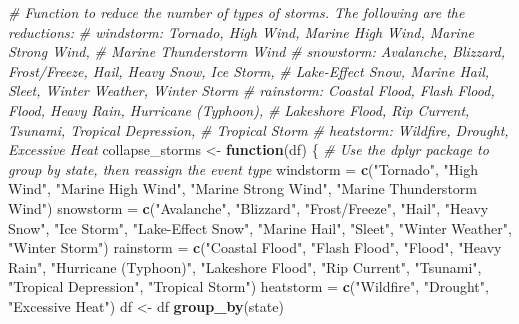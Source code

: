 \documentclass[10pt,]{article}
\newenvironment{Shaded}{}{}
\newcommand{\KeywordTok}[1]{\textcolor[rgb]{0.00,0.44,0.13}{\textbf{#1}}}
\newcommand{\StringTok}[1]{\textcolor[rgb]{0.25,0.44,0.63}{#1}}
\newcommand{\CommentTok}[1]{\textcolor[rgb]{0.38,0.63,0.69}{\textit{#1}}}
\newcommand{\ControlFlowTok}[1]{\textcolor[rgb]{0.00,0.44,0.13}{\textbf{#1}}}
\newcommand{\OperatorTok}[1]{\textcolor[rgb]{0.40,0.40,0.40}{#1}}
\newcommand{\NormalTok}[1]{#1}
\begin{document}
\begin{Shaded}
\begin{Highlighting}[]
\CommentTok{# Function to reduce the number of types of storms. The following are the reductions:}
\CommentTok{# windstorm: Tornado, High Wind, Marine High Wind, Marine Strong Wind,}
\CommentTok{#            Marine Thunderstorm Wind}
\CommentTok{# snowstorm: Avalanche, Blizzard, Frost/Freeze, Hail, Heavy Snow, Ice Storm, }
\CommentTok{#            Lake-Effect Snow, Marine Hail, Sleet, Winter Weather, Winter Storm}
\CommentTok{# rainstorm: Coastal Flood, Flash Flood, Flood, Heavy Rain, Hurricane (Typhoon), }
\CommentTok{#            Lakeshore Flood, Rip Current, Tsunami, Tropical Depression,}
\CommentTok{#            Tropical Storm}
\CommentTok{# heatstorm: Wildfire, Drought, Excessive Heat}
\NormalTok{collapse_storms <-}\StringTok{ }\ControlFlowTok{function}\NormalTok{(df) \{}
  \CommentTok{# Use the dplyr package to group by state, then reassign the event type}
\NormalTok{  windstorm =}\StringTok{ }\KeywordTok{c}\NormalTok{(}\StringTok{"Tornado"}\NormalTok{, }\StringTok{"High Wind"}\NormalTok{, }\StringTok{"Marine High Wind"}\NormalTok{, }\StringTok{"Marine Strong Wind"}\NormalTok{, }
                \StringTok{"Marine Thunderstorm Wind"}\NormalTok{)}
\NormalTok{  snowstorm =}\StringTok{ }\KeywordTok{c}\NormalTok{(}\StringTok{"Avalanche"}\NormalTok{, }\StringTok{"Blizzard"}\NormalTok{, }\StringTok{"Frost/Freeze"}\NormalTok{, }\StringTok{"Hail"}\NormalTok{, }\StringTok{"Heavy Snow"}\NormalTok{, }
                \StringTok{"Ice Storm"}\NormalTok{, }\StringTok{"Lake-Effect Snow"}\NormalTok{, }\StringTok{"Marine Hail"}\NormalTok{, }\StringTok{"Sleet"}\NormalTok{, }
                \StringTok{"Winter Weather"}\NormalTok{, }\StringTok{"Winter Storm"}\NormalTok{)}
\NormalTok{  rainstorm =}\StringTok{ }\KeywordTok{c}\NormalTok{(}\StringTok{"Coastal Flood"}\NormalTok{, }\StringTok{"Flash Flood"}\NormalTok{, }\StringTok{"Flood"}\NormalTok{, }\StringTok{"Heavy Rain"}\NormalTok{, }
                \StringTok{"Hurricane (Typhoon)"}\NormalTok{, }\StringTok{"Lakeshore Flood"}\NormalTok{, }\StringTok{"Rip Current"}\NormalTok{, }
                \StringTok{"Tsunami"}\NormalTok{, }\StringTok{"Tropical Depression"}\NormalTok{, }\StringTok{"Tropical Storm"}\NormalTok{)}
\NormalTok{  heatstorm =}\StringTok{ }\KeywordTok{c}\NormalTok{(}\StringTok{"Wildfire"}\NormalTok{, }\StringTok{"Drought"}\NormalTok{, }\StringTok{"Excessive Heat"}\NormalTok{)}
\NormalTok{  df <-}\StringTok{ }\NormalTok{df }\OperatorTok{%
\StringTok{    }\KeywordTok{group_by}\NormalTok{(state) }\OperatorTok{%
}}
\end{Highlighting}
\end{Shaded}
\end{document}
